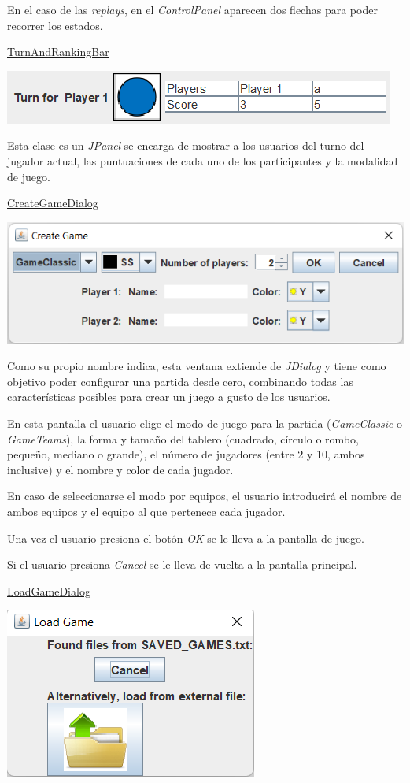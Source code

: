 \documentclass[../DocumentoOficial.tex]{subfiles}
\begin{document}
\begin{sprint}[4]
En el caso de las \textit{replays}, en el \textit{ControlPanel} aparecen dos flechas para poder recorrer los estados.

\underline{TurnAndRankingBar}
\begin{center}
\includegraphics[scale=1]{turn-ranking-panel-sprint3.png}
\end{center}

Esta clase es un \textit{JPanel} se encarga de mostrar a los usuarios del turno del jugador actual, las puntuaciones de cada uno de los participantes y la modalidad de juego.

\underline{CreateGameDialog}
\begin{center}
\includegraphics[scale=0.8]{create-game-sprint3.png}
\end{center}

Como su propio nombre indica, esta ventana extiende de \textit{JDialog} y tiene como objetivo poder configurar una partida desde cero, combinando todas las características posibles para crear un juego a gusto de los usuarios.

En esta pantalla el usuario elige el modo de juego para la partida (\textit{GameClassic} o \textit{GameTeams}), la forma y tamaño del tablero (cuadrado, círculo o rombo, pequeño, mediano o grande), el número de jugadores (entre 2 y 10, ambos inclusive) y el nombre y color de cada jugador.

En caso de seleccionarse el modo por equipos, el usuario introducirá el nombre de ambos equipos y el equipo al que pertenece cada jugador.

Una vez el usuario presiona el botón \textit{OK} se le lleva a la pantalla de juego.

Si el usuario presiona \textit{Cancel} se le lleva de vuelta a la pantalla principal.

\underline{LoadGameDialog}
\begin{center}
\includegraphics[scale=0.88]{load-dialog-sprint3.png}
\end{center}


\end{sprint}
\end{document}
